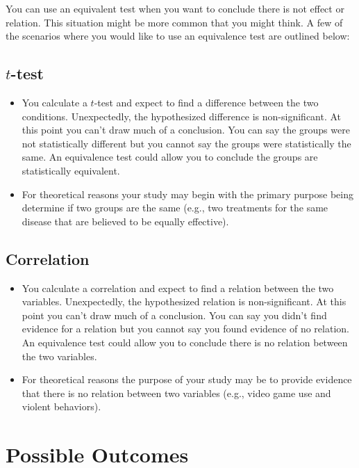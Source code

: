 \documentclass[
]{krantz}
\begin{document}
You can use an equivalent test when you want to conclude there is not effect or relation. This situation might be more common that you might think. A few of the scenarios where you would like to use an equivalence test are outlined below:

\hypertarget{t-test}{%
\subsection{\texorpdfstring{\(t\)-test}{t-test}}\label{t-test}}

\begin{itemize}
\item
  You calculate a \(t\)-test and expect to find a difference between the two conditions. Unexpectedly, the hypothesized difference is non-significant. At this point you can't draw much of a conclusion. You can say the groups were not statistically different but you cannot say the groups were statistically the same. An equivalence test could allow you to conclude the groups are statistically equivalent.
\item
  For theoretical reasons your study may begin with the primary purpose being determine if two groups are the same (e.g., two treatments for the same disease that are believed to be equally effective).
\end{itemize}

\hypertarget{correlation}{%
\subsection{Correlation}\label{correlation}}

\begin{itemize}
\item
  You calculate a correlation and expect to find a relation between the two variables. Unexpectedly, the hypothesized relation is non-significant. At this point you can't draw much of a conclusion. You can say you didn't find evidence for a relation but you cannot say you found evidence of no relation. An equivalence test could allow you to conclude there is no relation between the two variables.
\item
  For theoretical reasons the purpose of your study may be to provide evidence that there is no relation between two variables (e.g., video game use and violent behaviors).
\end{itemize}

\hypertarget{possible-outcomes}{%
\section{Possible Outcomes}\label{possible-outcomes}}
\end{document}
